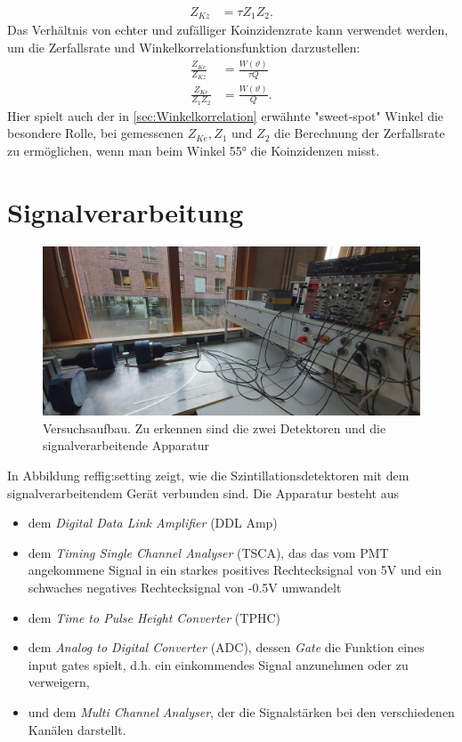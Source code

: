 \documentclass[%
aps,
onecolumn,
11pt,
tightenlines,
nofootinbib,
superscriptaddress,
floatfix,
prd,
]{revtex4-2}
\begin{document}
\begin{align}
	Z_{Kz} &= \tau Z_1 Z_2.
\end{align}
Das Verhältnis von echter und zufälliger Koinzidenzrate kann verwendet werden, um die Zerfallsrate und Winkelkorrelationsfunktion darzustellen:
\begin{align}
	\frac{Z_{Ke}}{Z_{Kz}} &= \frac{W(\vartheta)}{\tau Q} \\
	\frac{Z_{Ke}}{Z_1Z_2} &= \frac{W(\vartheta)}{Q}. \label{eq:qvalue}
\end{align}
Hier spielt auch der in \ref{sec:Winkelkorrelation} erwähnte "sweet-spot" Winkel die besondere Rolle, bei gemessenen $Z_{Ke}, Z_1$ und $Z_2$ die Berechnung der Zerfallsrate zu ermöglichen, wenn man beim Winkel 55° die Koinzidenzen misst.

\section{Signalverarbeitung}
\label{sec:Signalverarbeitung}
\begin{figure}[ht]
	\includegraphics[scale=0.14]{images/setting.jpg}
	\caption{Versuchsaufbau. Zu erkennen sind die zwei Detektoren und die signalverarbeitende Apparatur}
	\label{fig:setting}
\end{figure}
In Abbildung ref{fig:setting} zeigt, wie die Szintillationsdetektoren mit dem signalverarbeitendem Gerät verbunden sind. Die Apparatur besteht aus
\begin{itemize}
	\item dem \textit{Digital Data Link Amplifier} (DDL Amp) 
	\item dem \textit{Timing Single Channel Analyser} (TSCA), das das vom PMT angekommene Signal in ein starkes positives Rechtecksignal von 5V und ein schwaches negatives Rechtecksignal von -0.5V umwandelt
	\item dem \textit{Time to Pulse Height Converter} (TPHC)
	\item dem \textit{Analog to Digital Converter} (ADC), dessen \textit{Gate} die Funktion eines input gates spielt, d.h. ein einkommendes Signal anzunehmen oder zu verweigern,
	\item und dem \textit{Multi Channel Analyser}, der die Signalstärken bei den verschiedenen Kanälen darstellt.
\end{itemize}
\newpage
\end{document}
